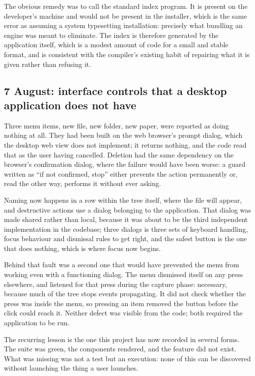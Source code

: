 \documentclass[11pt,a4paper]{article}
\begin{document}
The obvious remedy was to call the standard index program. It is present on the
developer's machine and would not be present in the installer, which is the same
error as assuming a system typesetting installation: precisely what bundling
an engine was meant to eliminate. The index is therefore generated by the
application itself, which is a modest amount of code for a small and stable
format, and is consistent with the compiler's existing habit of repairing what
it is given rather than refusing it.

\subsection{7 August: interface controls that a desktop application does not have}

Three menu items, new file, new folder, new paper, were reported as doing
nothing at all. They had been built on the web browser's prompt dialog, which
the desktop web view does not implement; it returns nothing, and the code read
that as the user having cancelled. Deletion had the same dependency on the
browser's confirmation dialog, where the failure would have been worse: a guard
written as ``if not confirmed, stop'' either prevents the action permanently or,
read the other way, performs it without ever asking.

Naming now happens in a row within the tree itself, where the file will appear,
and destructive actions use a dialog belonging to the application. That dialog
was made shared rather than local, because it was about to be the third
independent implementation in the codebase; three dialogs is three sets of
keyboard handling, focus behaviour and dismissal rules to get right, and the
safest button is the one that does nothing, which is where focus now begins.

Behind that fault was a second one that would have prevented the menu from
working even with a functioning dialog. The menu dismissed itself on any press
elsewhere, and listened for that press during the capture phase: necessary,
because much of the tree stops events propagating. It did not check whether the
press was inside the menu, so pressing an item removed the button before the
click could reach it. Neither defect was visible from the code; both required
the application to be run.

The recurring lesson is the one this project has now recorded in several forms.
The suite was green, the components rendered, and the feature did not exist.
What was missing was not a test but an execution: none of this can be discovered
without launching the thing a user launches.
\end{document}

